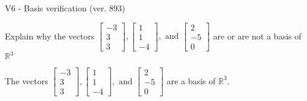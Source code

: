 \begin{exercise}
  \begin{exerciseTitle}V6 - Basis verification (ver. 893)\end{exerciseTitle}
  \begin{exerciseStatement}
    Explain why the vectors \(\left[\begin{array}{r}
-3 \\
3 \\
3
\end{array}\right] , \left[\begin{array}{r}
1 \\
1 \\
-4
\end{array}\right] , \text{ and } \left[\begin{array}{r}
2 \\
-5 \\
0
\end{array}\right]\) are or are not a basis of \(\mathbb{R}^3\)	


  \end{exerciseStatement}
  \begin{exerciseAnswer}
   The vectors \(\left[\begin{array}{r}
-3 \\
3 \\
3
\end{array}\right] , \left[\begin{array}{r}
1 \\
1 \\
-4
\end{array}\right] , \text{ and } \left[\begin{array}{r}
2 \\
-5 \\
0
\end{array}\right]\) 
  	 are  a basis of \(\mathbb{R}^3\).
  


  \end{exerciseAnswer}
\end{exercise}